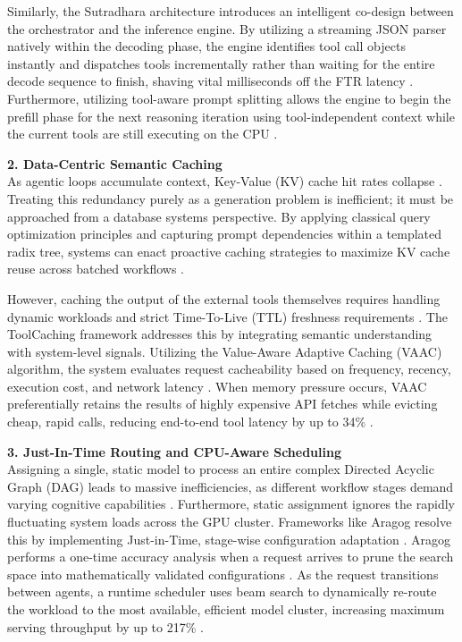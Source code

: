 \documentclass[10pt, letterpaper]{article}
\begin{document}
Similarly, the Sutradhara architecture introduces an intelligent co-design between the orchestrator and the inference engine. By utilizing a streaming JSON parser natively within the decoding phase, the engine identifies tool call objects instantly and dispatches tools incrementally rather than waiting for the entire decode sequence to finish, shaving vital milliseconds off the FTR latency \cite{sutradhara, data_systems}. Furthermore, utilizing tool-aware prompt splitting allows the engine to begin the prefill phase for the next reasoning iteration using tool-independent context while the current tools are still executing on the CPU \cite{sutradhara}.

\textbf{2. Data-Centric Semantic Caching} \\
As agentic loops accumulate context, Key-Value (KV) cache hit rates collapse \cite{sutradhara}. Treating this redundancy purely as a generation problem is inefficient; it must be approached from a database systems perspective. By applying classical query optimization principles and capturing prompt dependencies within a templated radix tree, systems can enact proactive caching strategies to maximize KV cache reuse across batched workflows \cite{data_systems}.

However, caching the output of the external tools themselves requires handling dynamic workloads and strict Time-To-Live (TTL) freshness requirements \cite{toolcaching}. The ToolCaching framework addresses this by integrating semantic understanding with system-level signals. Utilizing the Value-Aware Adaptive Caching (VAAC) algorithm, the system evaluates request cacheability based on frequency, recency, execution cost, and network latency \cite{toolcaching}. When memory pressure occurs, VAAC preferentially retains the results of highly expensive API fetches while evicting cheap, rapid calls, reducing end-to-end tool latency by up to 34\% \cite{toolcaching}.

\textbf{3. Just-In-Time Routing and CPU-Aware Scheduling} \\
Assigning a single, static model to process an entire complex Directed Acyclic Graph (DAG) leads to massive inefficiencies, as different workflow stages demand varying cognitive capabilities \cite{ai_nativebench}. Furthermore, static assignment ignores the rapidly fluctuating system loads across the GPU cluster. Frameworks like Aragog resolve this by implementing Just-in-Time, stage-wise configuration adaptation \cite{aragog}. Aragog performs a one-time accuracy analysis when a request arrives to prune the search space into mathematically validated configurations \cite{aragog}. As the request transitions between agents, a runtime scheduler uses beam search to dynamically re-route the workload to the most available, efficient model cluster, increasing maximum serving throughput by up to 217\% \cite{aragog}. 
\end{document}
